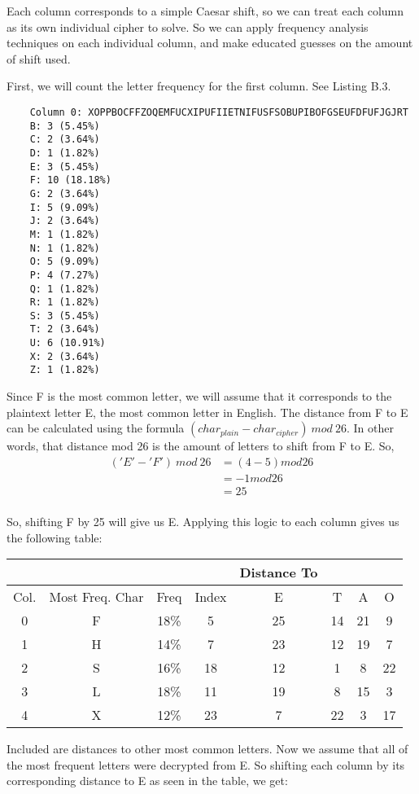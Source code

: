 \documentclass[10pt,letterpaper]{report}
\begin{document}
\begin{enumerate}
	Each column corresponds to a simple Caesar shift, so we can treat each column as its
	own individual cipher to solve. So we can apply frequency analysis techniques on each
	individual column, and make educated guesses on the amount of shift used.
	\par 
	First, we will count the letter frequency for the first column. See Listing B.3.
	\begin{verbatim}
	Column 0: XOPPBOCFFZOQEMFUCXIPUFIIETNIFUSFSOBUPIBOFGSEUFDFUFJGJRT
	B: 3 (5.45%)
	C: 2 (3.64%)
	D: 1 (1.82%)
	E: 3 (5.45%)
	F: 10 (18.18%)
	G: 2 (3.64%)
	I: 5 (9.09%)
	J: 2 (3.64%)
	M: 1 (1.82%)
	N: 1 (1.82%)
	O: 5 (9.09%)
	P: 4 (7.27%)
	Q: 1 (1.82%)
	R: 1 (1.82%)
	S: 3 (5.45%)
	T: 2 (3.64%)
	U: 6 (10.91%)
	X: 2 (3.64%)
	Z: 1 (1.82%)
	\end{verbatim}
	
	Since F is the most common letter, we will assume that it corresponds to the plaintext
	letter E, the most common letter in English. The distance from F to E can be 
	calculated using the formula  $(char_{plain} - char_{cipher})\ mod\ 26$. In other words, that distance
	mod 26 is the amount of letters to shift from F to E. So,
		\begin{align*}
		('E' - 'F')\ mod\ 26 &= (4 - 5) mod 26 \\
		&= -1 mod 26 \\
		&= 25 \\
		\end{align*}

	So, shifting F by 25 will give us E. Applying this logic to each column gives us the 
	following table:
	
	\begin{center}
	\begin{tabular}{ | c | c | c | c | c  c  c  c |}
	\hline
	& & & & Distance To & & &\\ \hline 
	Col. & Most Freq. Char & Freq & Index & E & T & A & O \\ \hline
	0 & F & 18\% & 5 & 25 & 14 & 21 & 9 \\ 
	1 & H & 14\% & 7 & 23 & 12 & 19 & 7 \\
	2 & S & 16\% & 18 & 12 & 1 & 8 & 22 \\
	3 & L & 18\% & 11 & 19 & 8 & 15 & 3 \\
	4 & X & 12\% & 23 & 7 & 22 & 3 & 17 \\
	\hline
	\end{tabular}
	\end{center}
	Included are distances to other most common letters. Now we assume that all of the
	most frequent letters were decrypted from E. So shifting each column by its
	corresponding distance to E as seen in the table, we get:
	

\end{enumerate}
\end{document}
